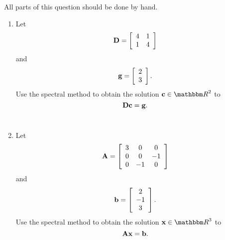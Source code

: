 
All parts of this question should be done by hand.

\begin{enumerate} 
\item Let
\[
{\bf D}=\left[\begin{array}{cc}4&1\\1&4\end{array}\right]
\]
and
\[
{\bf g}=\left[\begin{array}{c}2\\3\end{array}\right].
\]
Use the spectral method to obtain the solution $\Bc\in\R^2$ to
\[
{\bf D}{\bf c}={\bf g}.
\]
\\
\item Let
\[
{\bf A} = \left[\begin{array}{ccc} 3 & 0 & 0 \\ 0 & 0 & -1 \\ 0 & -1 & 0\end{array}\right]
\]
and
\[
{\bf b} = \left[\begin{array}{c} 2 \\ -1 \\ 3\end{array}\right].
\]
Use the spectral method to obtain the solution $\Bx\in\R^3$ to
\[
{\bf A}{\bf x} = {\bf b}.
\]
\end{enumerate}




